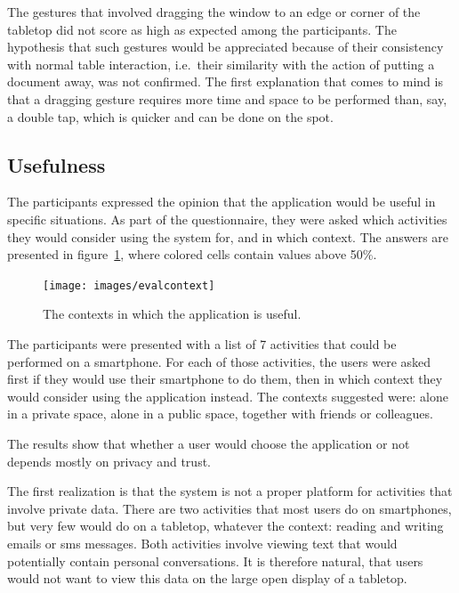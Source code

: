 The gestures that involved dragging the window to an edge or corner of the tabletop did not score as high as expected among the participants.
The hypothesis that such gestures would be appreciated because of their consistency with normal table interaction, i.e.\ their similarity with the action of putting a document away, was not confirmed.
The first explanation that comes to mind is that a dragging gesture requires more time and space to be performed than, say, a double tap, which is quicker and can be done on the spot.


\subsection{Usefulness}

The participants expressed the opinion that the application would be useful in specific situations.
As part of the questionnaire, they were asked which activities they would consider using the system for, and in which context.
The answers are presented in figure~\ref{fig:evalcontext}, where colored cells contain values above 50\%.

\begin{figure}[htb]
  \centering
    \texttt{[image: images/evalcontext]}
    \caption{The contexts in which the application is useful.}
    \label{fig:evalcontext}
\end{figure}

The participants were presented with a list of 7 activities that could be performed on a smartphone.
For each of those activities, the users were asked first if they would use their smartphone to do them, then in which context they would consider using the application instead.
The contexts suggested were: alone in a private space, alone in a public space, together with friends or colleagues.

The results show that whether a user would choose the application or not depends mostly on privacy and trust.

The first realization is that the system is not a proper platform for activities that involve private data.
There are two activities that most users do on smartphones, but very few would do on a tabletop, whatever the context: reading and writing emails or sms messages.
Both activities involve viewing text that would potentially contain personal conversations.
It is therefore natural, that users would not want to view this data on the large open display of a tabletop.

